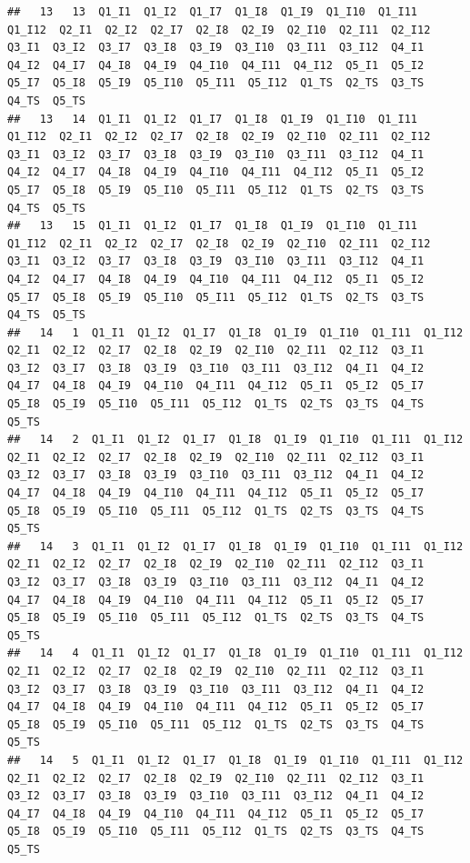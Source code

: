 \documentclass[]{book}
\begin{document}
\begin{verbatim}
##   13   13  Q1_I1  Q1_I2  Q1_I7  Q1_I8  Q1_I9  Q1_I10  Q1_I11  Q1_I12  Q2_I1  Q2_I2  Q2_I7  Q2_I8  Q2_I9  Q2_I10  Q2_I11  Q2_I12  Q3_I1  Q3_I2  Q3_I7  Q3_I8  Q3_I9  Q3_I10  Q3_I11  Q3_I12  Q4_I1  Q4_I2  Q4_I7  Q4_I8  Q4_I9  Q4_I10  Q4_I11  Q4_I12  Q5_I1  Q5_I2  Q5_I7  Q5_I8  Q5_I9  Q5_I10  Q5_I11  Q5_I12  Q1_TS  Q2_TS  Q3_TS  Q4_TS  Q5_TS
##   13   14  Q1_I1  Q1_I2  Q1_I7  Q1_I8  Q1_I9  Q1_I10  Q1_I11  Q1_I12  Q2_I1  Q2_I2  Q2_I7  Q2_I8  Q2_I9  Q2_I10  Q2_I11  Q2_I12  Q3_I1  Q3_I2  Q3_I7  Q3_I8  Q3_I9  Q3_I10  Q3_I11  Q3_I12  Q4_I1  Q4_I2  Q4_I7  Q4_I8  Q4_I9  Q4_I10  Q4_I11  Q4_I12  Q5_I1  Q5_I2  Q5_I7  Q5_I8  Q5_I9  Q5_I10  Q5_I11  Q5_I12  Q1_TS  Q2_TS  Q3_TS  Q4_TS  Q5_TS
##   13   15  Q1_I1  Q1_I2  Q1_I7  Q1_I8  Q1_I9  Q1_I10  Q1_I11  Q1_I12  Q2_I1  Q2_I2  Q2_I7  Q2_I8  Q2_I9  Q2_I10  Q2_I11  Q2_I12  Q3_I1  Q3_I2  Q3_I7  Q3_I8  Q3_I9  Q3_I10  Q3_I11  Q3_I12  Q4_I1  Q4_I2  Q4_I7  Q4_I8  Q4_I9  Q4_I10  Q4_I11  Q4_I12  Q5_I1  Q5_I2  Q5_I7  Q5_I8  Q5_I9  Q5_I10  Q5_I11  Q5_I12  Q1_TS  Q2_TS  Q3_TS  Q4_TS  Q5_TS
##   14   1  Q1_I1  Q1_I2  Q1_I7  Q1_I8  Q1_I9  Q1_I10  Q1_I11  Q1_I12  Q2_I1  Q2_I2  Q2_I7  Q2_I8  Q2_I9  Q2_I10  Q2_I11  Q2_I12  Q3_I1  Q3_I2  Q3_I7  Q3_I8  Q3_I9  Q3_I10  Q3_I11  Q3_I12  Q4_I1  Q4_I2  Q4_I7  Q4_I8  Q4_I9  Q4_I10  Q4_I11  Q4_I12  Q5_I1  Q5_I2  Q5_I7  Q5_I8  Q5_I9  Q5_I10  Q5_I11  Q5_I12  Q1_TS  Q2_TS  Q3_TS  Q4_TS  Q5_TS
##   14   2  Q1_I1  Q1_I2  Q1_I7  Q1_I8  Q1_I9  Q1_I10  Q1_I11  Q1_I12  Q2_I1  Q2_I2  Q2_I7  Q2_I8  Q2_I9  Q2_I10  Q2_I11  Q2_I12  Q3_I1  Q3_I2  Q3_I7  Q3_I8  Q3_I9  Q3_I10  Q3_I11  Q3_I12  Q4_I1  Q4_I2  Q4_I7  Q4_I8  Q4_I9  Q4_I10  Q4_I11  Q4_I12  Q5_I1  Q5_I2  Q5_I7  Q5_I8  Q5_I9  Q5_I10  Q5_I11  Q5_I12  Q1_TS  Q2_TS  Q3_TS  Q4_TS  Q5_TS
##   14   3  Q1_I1  Q1_I2  Q1_I7  Q1_I8  Q1_I9  Q1_I10  Q1_I11  Q1_I12  Q2_I1  Q2_I2  Q2_I7  Q2_I8  Q2_I9  Q2_I10  Q2_I11  Q2_I12  Q3_I1  Q3_I2  Q3_I7  Q3_I8  Q3_I9  Q3_I10  Q3_I11  Q3_I12  Q4_I1  Q4_I2  Q4_I7  Q4_I8  Q4_I9  Q4_I10  Q4_I11  Q4_I12  Q5_I1  Q5_I2  Q5_I7  Q5_I8  Q5_I9  Q5_I10  Q5_I11  Q5_I12  Q1_TS  Q2_TS  Q3_TS  Q4_TS  Q5_TS
##   14   4  Q1_I1  Q1_I2  Q1_I7  Q1_I8  Q1_I9  Q1_I10  Q1_I11  Q1_I12  Q2_I1  Q2_I2  Q2_I7  Q2_I8  Q2_I9  Q2_I10  Q2_I11  Q2_I12  Q3_I1  Q3_I2  Q3_I7  Q3_I8  Q3_I9  Q3_I10  Q3_I11  Q3_I12  Q4_I1  Q4_I2  Q4_I7  Q4_I8  Q4_I9  Q4_I10  Q4_I11  Q4_I12  Q5_I1  Q5_I2  Q5_I7  Q5_I8  Q5_I9  Q5_I10  Q5_I11  Q5_I12  Q1_TS  Q2_TS  Q3_TS  Q4_TS  Q5_TS
##   14   5  Q1_I1  Q1_I2  Q1_I7  Q1_I8  Q1_I9  Q1_I10  Q1_I11  Q1_I12  Q2_I1  Q2_I2  Q2_I7  Q2_I8  Q2_I9  Q2_I10  Q2_I11  Q2_I12  Q3_I1  Q3_I2  Q3_I7  Q3_I8  Q3_I9  Q3_I10  Q3_I11  Q3_I12  Q4_I1  Q4_I2  Q4_I7  Q4_I8  Q4_I9  Q4_I10  Q4_I11  Q4_I12  Q5_I1  Q5_I2  Q5_I7  Q5_I8  Q5_I9  Q5_I10  Q5_I11  Q5_I12  Q1_TS  Q2_TS  Q3_TS  Q4_TS  Q5_TS

\end{verbatim}
\end{document}
